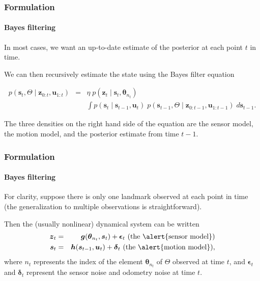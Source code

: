 \documentclass[aspectratio=169]{beamer}
\renewcommand{\vec}[1]{\boldsymbol{#1}}
\begin{document}
\begin{frame}
\frametitle{Formulation}
\framesubtitle{Bayes filtering}

In most cases, we want an \alert{up-to-date} estimate of the posterior
at each point $t$ in time.

\medskip

We can then recursively estimate the state using
the \alert{Bayes filter} equation

\begin{eqnarray*}
p(\vec{s}_t, \Theta \mid \vec{z}_{0:t}, \vec{u}_{1:t})
   &=& \eta \; p(\vec{z}_t \mid \vec{s}_t, \vec{\theta}_{n_t}) \\
   & & \int p(\vec{s}_t \mid \vec{s}_{t-1}, \vec{u}_t) \;
   p(\vec{s}_{t-1}, \Theta \mid \vec{z}_{0:t-1},
                \vec{u}_{1:t-1}) \; d\vec{s}_{t-1}.
\end{eqnarray*}

\medskip

The three densities on the right hand side of the equation are the
\alert{sensor model}, the \alert{motion model}, and the posterior
estimate from time $t-1$.


\end{frame}

\begin{frame}
\frametitle{Formulation}
\framesubtitle{Bayes filtering}

For clarity, suppose there is only \alert{one landmark}
observed at each point
in time (the generalization to multiple observations is straightforward).

\medskip

Then the (usually nonlinear) dynamical system can be written
\begin{eqnarray*}
  \vec{z}_t &=&
    \vec{g}(\vec{\theta}_{n_t}, \vec{s}_t) + \vec{\epsilon}_t
      \text{ (the \alert{sensor model})}\\
  \vec{s}_t &=&
    \vec{h}(\vec{s}_{t-1}, \vec{u}_t) + \vec{\delta}_t
      \text{ (the \alert{motion model})},
\end{eqnarray*}
where $n_t$ represents the index of the element $\vec{\theta}_{n_t}$ of
$\Theta$ observed at time $t$, and 
$\vec{\epsilon}_t$ and $\vec{\delta}_t$ represent the sensor noise and
odometry noise at time $t$.

\end{frame}
\end{document}
